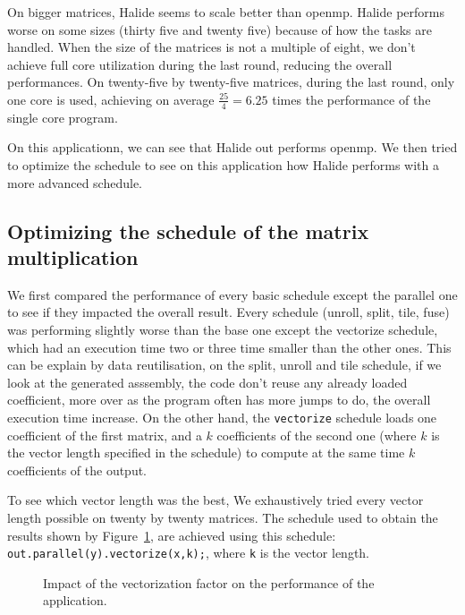 	On bigger matrices, Halide seems to scale better than \gls{openmp}. Halide performs worse on some sizes (thirty five and twenty five) because of how the tasks are handled.
	When the size of the matrices is not a multiple of eight, we don't achieve full core utilization during the last round, reducing the overall performances. 
	On twenty-five by twenty-five matrices, during the last round, only one core is used, achieving on average $\frac{25}{4} = 6.25$ times the performance of the single core program.
	
	On this applicationn, we can see that Halide out performs \gls{openmp}. We then  tried to optimize the schedule to see on this application how Halide performs with a more advanced schedule.

\subsection{Optimizing the schedule of the matrix multiplication}
\label{sec:optimization}
	We first compared the performance of every basic schedule except the parallel one to see if they impacted the overall result. Every schedule (unroll, split, tile, fuse) was performing slightly worse than the base one except the vectorize schedule, which had an execution time two or three time smaller than the other ones.
	This can be explain by data reutilisation, on the split, unroll and tile schedule, if we look at the generated asssembly, the code don't reuse any already loaded coefficient, more over as the program often has more jumps to do, the overall execution time increase.
	On the other hand, the \texttt{vectorize} schedule loads one coefficient of the first matrix, and a $k$ coefficients of the second one (where $k$ is the vector length specified in the schedule) to compute at the same time $k$ coefficients of the output.

	To see which vector length was the best, We exhaustively tried every vector length possible on twenty by twenty matrices. The schedule used to obtain the results shown by Figure~\ref{Fig:Vectorization}, are achieved using this schedule: \texttt{out.parallel(y).vectorize(x,k);}, where \texttt{k} is the vector length.

\begin{figure}[H]
	\begin{center}
	\resizebox{10cm}{!}{}
	\label{Fig:Vectorization}
		\caption{Impact of the vectorization factor on the performance of the application.}
	\end{center}
\end{figure}

